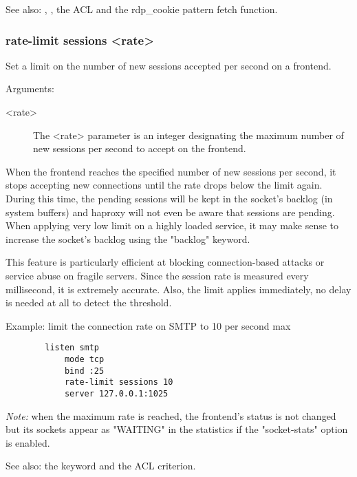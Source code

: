   See also: , , the  ACL and
  the rdp\_cookie pattern fetch function.

\subsubsection[rate-limit sessions]{rate-limit sessions <rate>}


  Set a limit on the number of new sessions accepted per second on a frontend.


  Arguments:
  \begin{description}
  \item[<rate>] The <rate> parameter is an integer designating the maximum number
              of new sessions per second to accept on the frontend.
  \end{description}
  
  When the frontend reaches the specified number of new sessions per second, it
  stops accepting new connections until the rate drops below the limit again.
  During this time, the pending sessions will be kept in the socket's backlog
  (in system buffers) and haproxy will not even be aware that sessions are
  pending. When applying very low limit on a highly loaded service, it may make
  sense to increase the socket's backlog using the "backlog" keyword.

  This feature is particularly efficient at blocking connection-based attacks
  or service abuse on fragile servers. Since the session rate is measured every
  millisecond, it is extremely accurate. Also, the limit applies immediately,
  no delay is needed at all to detect the threshold.

  Example: limit the connection rate on SMTP to 10 per second max
  \begin{verbatim} 
        listen smtp
            mode tcp
            bind :25
            rate-limit sessions 10
            server 127.0.0.1:1025
  \end{verbatim}

  \emph{Note:} when the maximum rate is reached, the frontend's status is not changed
         but its sockets appear as "WAITING" in the statistics if the
         "socket-stats" option is enabled.

  See also: the  keyword and the  ACL criterion.


